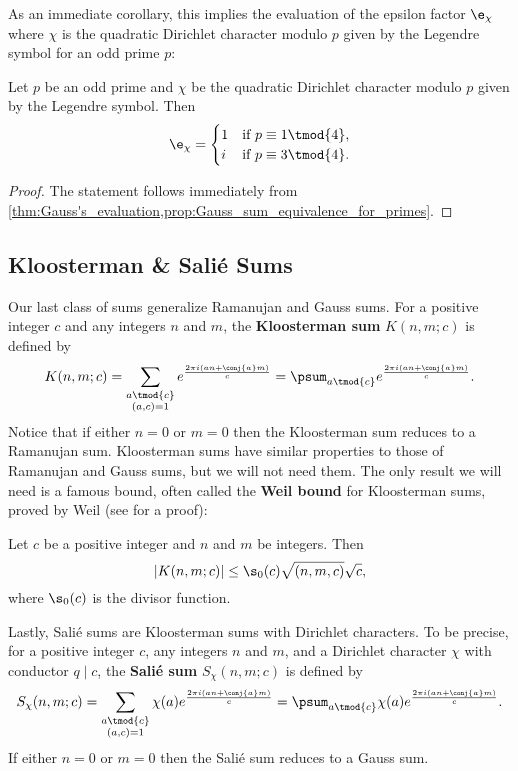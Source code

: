         As an immediate corollary, this implies the evaluation of the epsilon factor $\e_{\chi}$ where $\chi$ is the quadratic Dirichlet character modulo $p$ given by the Legendre symbol for an odd prime $p$:

        \begin{corollary}
          Let $p$ be an odd prime and $\chi$ be the quadratic Dirichlet character modulo $p$ given by the Legendre symbol. Then
          \[
            \e_{\chi} = \begin{cases} 1 & \text{if $p \equiv 1 \tmod{4}$}, \\ i & \text{if $p \equiv 3 \tmod{4}$}. \end{cases}
          \]
        \end{corollary}
        \begin{proof}
          The statement follows immediately from \cref{thm:Gauss's_evaluation,prop:Gauss_sum_equivalence_for_primes}.
        \end{proof}
      \subsection*{Kloosterman \& Sali\'e Sums}
        Our last class of sums generalize Ramanujan and Gauss sums. For a positive integer $c$ and any integers $n$ and $m$, the \textbf{Kloosterman sum} $K(n,m;c)$ is defined by
        \[
          K(n,m;c) = \sum_{\substack{a \tmod{c} \\ (a,c) = 1}}e^{\frac{2\pi i(an+\conj{a}m)}{c}} = \psum_{a \tmod{c}}e^{\frac{2\pi i(an+\conj{a}m)}{c}}.
        \]
        Notice that if either $n = 0$ or $m = 0$ then the Kloosterman sum reduces to a Ramanujan sum. Kloosterman sums have similar properties to those of Ramanujan and Gauss sums, but we will not need them. The only result we will need is a famous bound, often called the \textbf{Weil bound} for Kloosterman sums, proved by Weil (see \cite{weil1948some} for a proof):

        \begin{theorem}
          Let $c$ be a positive integer and $n$ and $m$ be integers. Then
          \[
            |K(n,m;c)| \le \s_{0}(c)\sqrt{(n,m,c)}\sqrt{c},
          \]
          where $\s_{0}(c)$ is the divisor function.
        \end{theorem}

        Lastly, Sali\'e sums are Kloosterman sums with Dirichlet characters. To be precise, for a positive integer $c$, any integers $n$ and $m$, and a Dirichlet character $\chi$ with conductor $q \mid c$, the \textbf{Sali\'e sum} $S_{\chi}(n,m;c)$ is defined by
        \[
          S_{\chi}(n,m;c) = \sum_{\substack{a \tmod{c} \\ (a,c) = 1}}\chi(a)e^{\frac{2\pi i(an+\conj{a}m)}{c}} = \psum_{a \tmod{c}}\chi(a)e^{\frac{2\pi i(an+\conj{a}m)}{c}}.
        \]
        If either $n = 0$ or $m = 0$ then the Sali\'e sum reduces to a Gauss sum.
